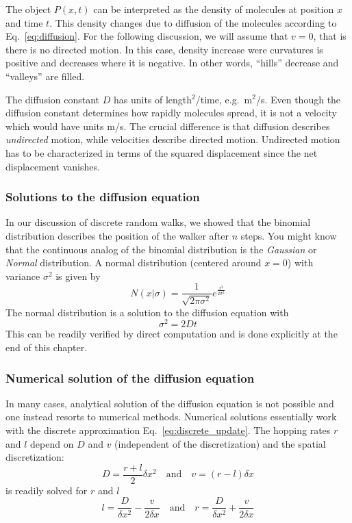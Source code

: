 The object $P(x,t)$ can be interpreted as the density of molecules at position $x$ and time $t$.
This density changes due to diffusion of the molecules according to Eq.~\ref{eq:diffusion}.
For the following discussion, we will assume that $v=0$, that is there is no directed motion.
In this case, density increase were curvatures is positive and decreases where it is negative.
In other words, ``hills'' decrease and ``valleys'' are filled.

The diffusion constant $D$ has units of length${}^2$/time, e.g.~m$^2$/s.
Even though the diffusion constant determines how rapidly molecules spread, it is not a velocity which would have units m/s.
The crucial difference is that diffusion describes \emph{undirected} motion, while velocities describe directed motion.
Undirected motion has to be characterized in terms of the squared displacement since the net displacement vanishes.


\subsubsection{Solutions to the diffusion equation}
In our discussion of discrete random walks, we showed that the binomial distribution describes the position of the walker after $n$ steps.
You might know that the continuous analog of the binomial distribution is the {\it Gaussian} or {\it Normal} distribution.
A normal distribution (centered around $x=0$) with variance $\sigma^2$ is given by
\begin{equation}
	N(x | \sigma) = \frac{1}{\sqrt{2\pi \sigma^2}} e^{\frac{x^2}{2\sigma^2}}
\end{equation}
The normal distribution is a solution to the diffusion equation with
\begin{equation}
	\sigma^2 = 2Dt
\end{equation}
This can be readily verified by direct computation and is done explicitly at the end of this chapter.

\subsubsection{Numerical solution of the diffusion equation}
In many cases, analytical solution of the diffusion equation is not possible and one instead resorts to numerical methods.
Numerical solutions essentially work with the discrete approximation Eq.~\ref{eq:discrete_update}.
The hopping rates $r$ and $l$ depend on $D$ and $v$ (independent of the discretization) and the spatial discretization:
\begin{equation}
	D = \frac{r+l}{2}\delta x^2 \quad \mathrm{and} \quad v =(r-l)\delta x
\end{equation}
is readily solved for $r$ and $l$
\begin{equation}
	l = \frac{D}{\delta x^2}- \frac{v}{2\delta x}\quad \mathrm{and} \quad
	r = \frac{D}{\delta x^2} + \frac{v}{2\delta x}
\end{equation}

